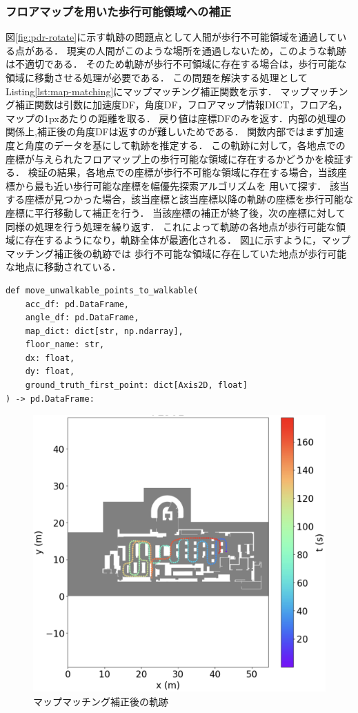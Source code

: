 

\subsubsection{フロアマップを用いた歩行可能領域への補正}

図\ref{fig:pdr-rotate}に示す軌跡の問題点として人間が歩行不可能領域を通過している点がある．
現実の人間がこのような場所を通過しないため，このような軌跡は不適切である．
そのため軌跡が歩行不可領域に存在する場合は，歩行可能な領域に移動させる処理が必要である．
この問題を解決する処理としてListing\ref{lst:map-matching}にマップマッチング補正関数を示す．
マップマッチング補正関数は引数に加速度DF，角度DF，フロアマップ情報DICT，フロア名，マップの1pxあたりの距離を取る．
戻り値は座標DFのみを返す．内部の処理の関係上,補正後の角度DFは返すのが難しいためである．
関数内部ではまず加速度と角度のデータを基にして軌跡を推定する．
この軌跡に対して，各地点での座標が与えられたフロアマップ上の歩行可能な領域に存在するかどうかを検証する．
検証の結果，各地点での座標が歩行不可能な領域に存在する場合，当該座標から最も近い歩行可能な座標を幅優先探索アルゴリズムを
用いて探す．
該当する座標が見つかった場合，該当座標と該当座標以降の軌跡の座標を歩行可能な座標に平行移動して補正を行う．
当該座標の補正が終了後，次の座標に対して同様の処理を行う処理を繰り返す．
これによって軌跡の各地点が歩行可能な領域に存在するようになり，軌跡全体が最適化される．
図\ref{fig:map-matching}に示すように，マップマッチング補正後の軌跡では
歩行不可能な領域に存在していた地点が歩行可能な地点に移動されている．

\begin{lstlisting}[caption={マップマッチング補正}, label=lst:map-matching]
def move_unwalkable_points_to_walkable(
    acc_df: pd.DataFrame,
    angle_df: pd.DataFrame,
    map_dict: dict[str, np.ndarray],
    floor_name: str,
    dx: float,
    dy: float,
    ground_truth_first_point: dict[Axis2D, float]
) -> pd.DataFrame:

\end{lstlisting}

\begin{figure}[h]
	\centering
	\includegraphics[width=\linewidth]{image/map-matching.jpg}
	\caption{マップマッチング補正後の軌跡}    \label{fig:map-matching}
\end{figure}


